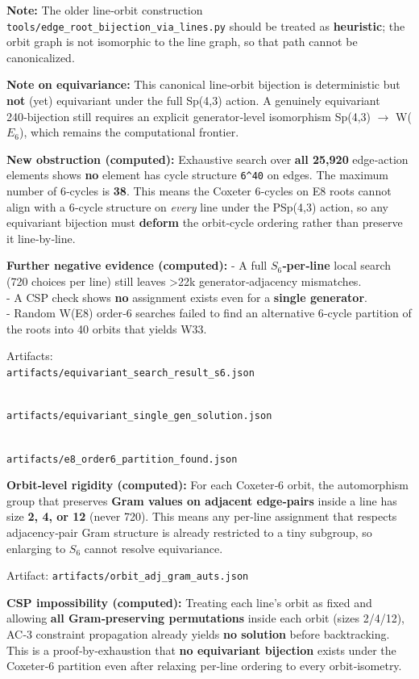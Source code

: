 \documentclass[11pt]{article}
\begin{document}
\textbf{Note:} The older line‑orbit construction
\texttt{tools/edge\_root\_bijection\_via\_lines.py} should be treated as
\textbf{heuristic}; the orbit graph is not isomorphic to the line graph,
so that path cannot be canonicalized.

\textbf{Note on equivariance:} This canonical line‑orbit bijection is
deterministic but \textbf{not} (yet) equivariant under the full Sp(4,3)
action. A genuinely equivariant 240‑bijection still requires an explicit
generator‑level isomorphism Sp(4,3) \ensuremath{\rightarrow}
W(\(E_{6}\)), which remains the computational frontier.

\textbf{New obstruction (computed):} Exhaustive search over \textbf{all
25,920} edge‑action elements shows \textbf{no} element has cycle
structure \texttt{6\^{}40} on edges. The maximum number of 6‑cycles is
\textbf{38}. This means the Coxeter 6‑cycles on E8 roots cannot align
with a 6‑cycle structure on \emph{every} line under the PSp(4,3) action,
so any equivariant bijection must \textbf{deform} the orbit‑cycle
ordering rather than preserve it line‑by‑line.

\textbf{Further negative evidence (computed):} - A full
\textbf{\(S_{6}\)‑per‑line} local search (720 choices per line) still
leaves \textgreater22k generator‑adjacency mismatches.\\
- A CSP check shows \textbf{no} assignment exists even for a
\textbf{single generator}.\\
- Random W(E8) order‑6 searches failed to find an alternative 6‑cycle
partition of the roots into 40 orbits that yields W33.

Artifacts:\\
\texttt{artifacts/equivariant\_search\_result\_s6.json}\strut \\
\texttt{artifacts/equivariant\_single\_gen\_solution.json}\strut \\
\texttt{artifacts/e8\_order6\_partition\_found.json}

\textbf{Orbit‑level rigidity (computed):} For each Coxeter‑6 orbit, the
automorphism group that preserves \textbf{Gram values on adjacent
edge‑pairs} inside a line has size \textbf{2, 4, or 12} (never 720).
This means any per‑line assignment that respects adjacency‑pair Gram
structure is already restricted to a tiny subgroup, so enlarging to
\(S_{6}\) cannot resolve equivariance.

Artifact: \texttt{artifacts/orbit\_adj\_gram\_auts.json}

\textbf{CSP impossibility (computed):} Treating each line's orbit as
fixed and allowing \textbf{all Gram‑preserving permutations} inside each
orbit (sizes 2/4/12), AC‑3 constraint propagation already yields
\textbf{no solution} before backtracking. This is a proof‑by‑exhaustion
that \textbf{no equivariant bijection} exists under the Coxeter‑6
partition even after relaxing per‑line ordering to every orbit‑isometry.
\end{document}
